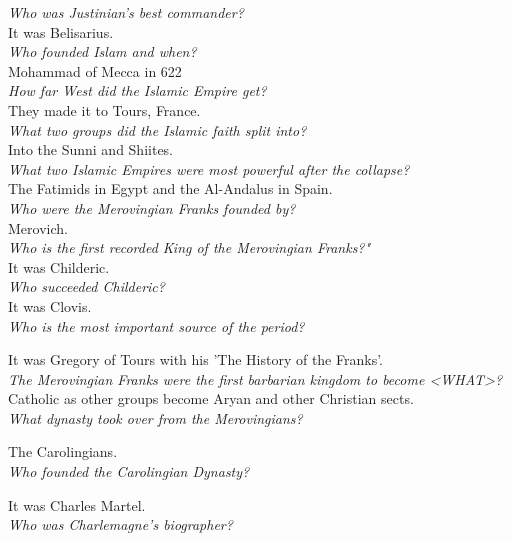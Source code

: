 \documentclass[12pt]{article}
\begin{document}
\textit{Who was Justinian's best commander?}\\
It was Belisarius.\\

\textit{Who founded Islam and when?}\\
Mohammad of Mecca in 622\\

\textit{How far West did the Islamic Empire get?}\\
They made it to Tours, France.\\

\textit{What two groups did the Islamic faith split into?}\\
Into the Sunni and Shiites.\\

\textit{What two Islamic Empires were most powerful after the collapse?}\\
The Fatimids in Egypt and the Al-Andalus in Spain.\\

\textit{Who were the Merovingian Franks founded by?}\\
Merovich.\\

\textit{Who is the first recorded King of the Merovingian Franks?"}\\
It was Childeric.\\

\textit{Who succeeded Childeric?}\\
It was Clovis.\\

\textit{Who is the most important source of the period?}

It was Gregory of Tours with his 'The History of the Franks'.\\

\textit{The Merovingian Franks were the first barbarian kingdom to become <WHAT>?}\\
Catholic as other groups become Aryan and other Christian sects.\\

\textit{What dynasty took over from the Merovingians?}

The Carolingians.\\

\textit{Who founded the Carolingian Dynasty?}

It was Charles Martel.\\

\textit{Who was Charlemagne's biographer?}
\end{document}
